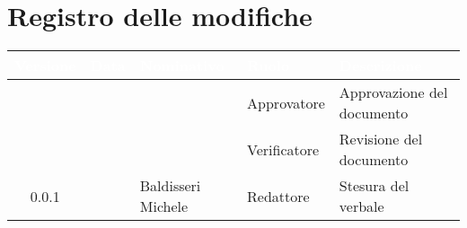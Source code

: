 \section*{Registro delle modifiche}
{
\renewcommand{\arraystretch}{1.5}
\centering
\begin{longtable}{c C{2.6cm}  C{2.6cm} C{2.6cm} C{3.5cm}}
\textcolor{white}{\textbf{Versione}}&
\textcolor{white}{\textbf{Data}}&
\textcolor{white}{\textbf{Nominativo}}&
\textcolor{white}{\textbf{Ruolo}}&
\textcolor{white}{\textbf{Descrizione}}\\	
\endhead
		
 &  &  & Approvatore & Approvazione del documento\\

 &  &  & Verificatore & Revisione del documento\\

0.0.1 & \Data{} & Baldisseri Michele & Redattore & Stesura del verbale\\
		
\end{longtable}
}
